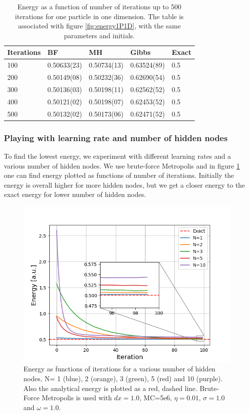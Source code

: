 \documentclass[norsk,a4paper,12pt]{article}
\begin{document}
\begin{table} [H]
	\caption{Energy as a function of number of iterations up to 500 iterations for one particle in one dimension. The table is associated with figure \ref{fig:energy1P1D}, with the same parameters and initials.  \vspace{2mm}}
	\begin{tabularx}{\textwidth}{X|XXXX} \hline\hline
		\label{tab:energies1P1D}
		Iterations & BF & MH & Gibbs & Exact \\ \hline
				100 & 0.50633(23) & 0.50734(13) & 0.63524(89) & 0.5 \\
				200 & 0.50149(08) & 0.50232(36) & 0.62690(54) & 0.5 \\
				300 & 0.50136(03) & 0.50198(11) & 0.62562(52) & 0.5 \\
				400 & 0.50121(02) & 0.50198(07) & 0.62453(52) & 0.5 \\
				500 & 0.50132(02) & 0.50173(06) & 0.62471(52) & 0.5 \\ \hline
	\end{tabularx}
\end{table}

\subsubsection{Playing with learning rate and number of hidden nodes}
To find the lowest energy, we experiment with different learning rates and a various number of hidden nodes. We use brute-force Metropolis and in figure \ref{fig:compare_nodes} one can find energy plotted as  functions of number of iterations. Initially the energy is overall higher for more hidden nodes, but we get a closer energy to the exact energy for lower number of hidden nodes. 

 \begin{figure} [H]
 	\centering
 	\includegraphics[scale=0.8]{plots/energy_compare_nodes.png}
 	\caption{Energy as functions of iterations for a various number of hidden nodes, N= 1 (blue), 2 (orange), 3 (green), 5 (red) and 10 (purple). Also the analytical energy is plotted as a red, dashed line. Brute-Force Metropolis is used with $dx=1.0$, MC=5e6, $\eta=0.01$, $\sigma=1.0$ and $\omega=1.0$.}
 	\label{fig:compare_nodes}
 \end{figure}
 
\end{document}
